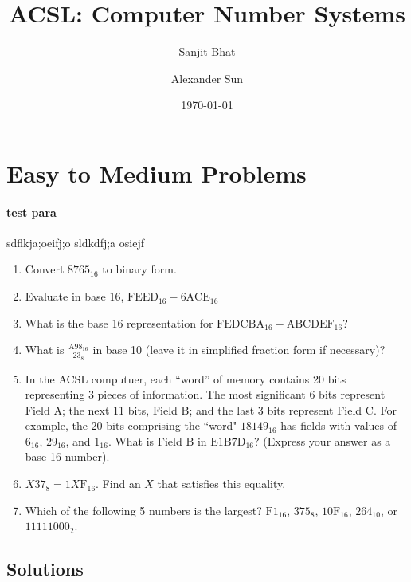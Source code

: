 \documentclass[12pt]{article}
\title{ACSL: Computer Number Systems}
\author{Sanjit Bhat \and Alexander Sun}
\date{\today}
\begin{document}
\maketitle


\section{Easy to Medium Problems}
\paragraph{test para}
sdflkja;oeifj;o sldkdfj;a osiejf

\begin{enumerate}

\item
Convert $8765_{16}$ to binary form.

\item
Evaluate in base 16, $\text{FEED}_{16} - \text{6ACE}_{16}$

\item
What is the base 16 representation for $\text{FEDCBA}_{16} - \text{ABCDEF}_{16}$?

\item
What is $\frac{\text{A98}_{16}}{23_{8}}$ in base 10 (leave it in simplified fraction form if necessary)?

\item
In the ACSL computuer, each ``word'' of memory contains 20 bits representing 3 pieces of information. 
The most significant 6 bits represent Field A; the next 11 bits, Field B; and the last 3 bits represent Field C. 
For example, the 20 bits comprising the ``word" $18149_{16}$ has fields with values of $6_{16}$, $29_{16}$,
and $1_{16}$.
What is Field B in $\text{E1B7D}_{16}$? (Express your answer as a base 16 number).

\item
$X37_{8} = 1X\text{F}_{16}$. Find an $X$ that satisfies this equality.

\item
Which of the following 5 numbers is the largest? 
$\text{F1}_{16}$, $375_{8}$, $\text{10F}_{16}$, $264_{10}$, or $11111000_{2}$.

\end{enumerate}


\subsection{Solutions}
\end{document}
